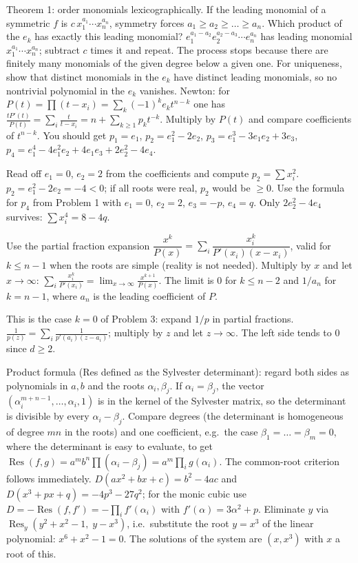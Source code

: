 \documentclass[11pt,a4paper]{article}
\begin{document}

 Theorem 1: order monomials lexicographically. If the leading monomial of a symmetric $f$ is $c\,x_1^{a_1}\cdots x_n^{a_n}$, symmetry forces $a_1\ge a_2\ge\dots\ge a_n$. Which product of the $e_k$ has exactly this leading monomial?
 $e_1^{a_1-a_2}e_2^{a_2-a_3}\cdots e_n^{a_n}$ has leading monomial $x_1^{a_1}\cdots x_n^{a_n}$; subtract $c$ times it and repeat. The process stops because there are finitely many monomials of the given degree below a given one. For uniqueness, show that distinct monomials in the $e_k$ have distinct leading monomials, so no nontrivial polynomial in the $e_k$ vanishes.
 Newton: for $P(t)=\prod(t-x_i)=\sum_k(-1)^ke_kt^{n-k}$ one has $\frac{tP'(t)}{P(t)}=\sum_i\frac{t}{t-x_i}=n+\sum_{k\ge1}p_kt^{-k}$. Multiply by $P(t)$ and compare coefficients of $t^{n-k}$.
 You should get $p_1=e_1$, $p_2=e_1^2-2e_2$, $p_3=e_1^3-3e_1e_2+3e_3$, $p_4=e_1^4-4e_1^2e_2+4e_1e_3+2e_2^2-4e_4$.

 Read off $e_1=0$, $e_2=2$ from the coefficients and compute $p_2=\sum x_i^2$.
 $p_2=e_1^2-2e_2=-4<0$; if all roots were real, $p_2$ would be $\ge0$.
 Use the formula for $p_4$ from Problem 1 with $e_1=0$, $e_2=2$, $e_3=-p$, $e_4=q$.
 Only $2e_2^2-4e_4$ survives: $\sum x_i^4=8-4q$.

 Use the partial fraction expansion $\dfrac{x^k}{P(x)}=\sum_i\dfrac{x_i^k}{P'(x_i)(x-x_i)}$, valid for $k\le n-1$ when the roots are simple (reality is not needed).
 Multiply by $x$ and let $x\to\infty$: $\sum_i\frac{x_i^k}{P'(x_i)}=\lim_{x\to\infty}\frac{x^{k+1}}{P(x)}$.
 The limit is $0$ for $k\le n-2$ and $1/a_n$ for $k=n-1$, where $a_n$ is the leading coefficient of $P$.

 This is the case $k=0$ of Problem 3: expand $1/p$ in partial fractions.
 $\frac{1}{p(z)}=\sum_i\frac{1}{p'(a_i)(z-a_i)}$; multiply by $z$ and let $z\to\infty$. The left side tends to $0$ since $d\ge2$.

 Product formula (Res defined as the Sylvester determinant): regard both sides as polynomials in $a,b$ and the roots $\alpha_i,\beta_j$. If $\alpha_i=\beta_j$, the vector $(\alpha_i^{m+n-1},\dots,\alpha_i,1)$ is in the kernel of the Sylvester matrix, so the determinant is divisible by every $\alpha_i-\beta_j$.
 Compare degrees (the determinant is homogeneous of degree $mn$ in the roots) and one coefficient, e.g.\ the case $\beta_1=\dots=\beta_m=0$, where the determinant is easy to evaluate, to get $\operatorname{Res}(f,g)=a^mb^n\prod(\alpha_i-\beta_j)=a^m\prod_i g(\alpha_i)$. The common-root criterion follows immediately.
 $D(ax^2+bx+c)=b^2-4ac$ and $D(x^3+px+q)=-4p^3-27q^2$; for the monic cubic use $D=-\operatorname{Res}(f,f')=-\prod_i f'(\alpha_i)$ with $f'(\alpha)=3\alpha^2+p$.
 Eliminate $y$ via $\operatorname{Res}_y(y^2+x^2-1,\;y-x^3)$, i.e.\ substitute the root $y=x^3$ of the linear polynomial: $x^6+x^2-1=0$. The solutions of the system are $(x,x^3)$ with $x$ a root of this.
\end{document}
